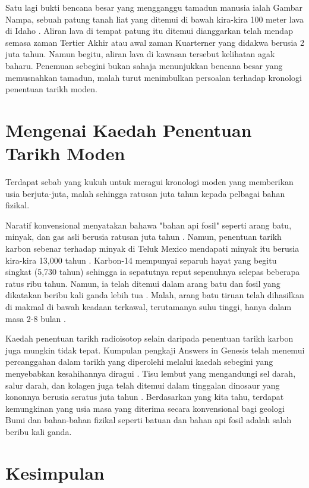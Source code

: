 \documentclass[10pt,twocolumn,letterpaper]{article}
\begin{document}
Satu lagi bukti bencana besar yang mengganggu tamadun manusia ialah Gambar Nampa, sebuah patung tanah liat yang ditemui di bawah kira-kira 100 meter lava di Idaho \cite{102,103}. Aliran lava di tempat patung itu ditemui dianggarkan telah mendap semasa zaman Tertier Akhir atau awal zaman Kuarterner yang didakwa berusia 2 juta tahun. Namun begitu, aliran lava di kawasan tersebut kelihatan agak baharu. Penemuan sebegini bukan sahaja menunjukkan bencana besar yang memusnahkan tamadun, malah turut menimbulkan persoalan terhadap kronologi penentuan tarikh moden.

\section{Mengenai Kaedah Penentuan Tarikh Moden}

Terdapat sebab yang kukuh untuk meragui kronologi moden yang memberikan usia berjuta-juta, malah sehingga ratusan juta tahun kepada pelbagai bahan fizikal.

Naratif konvensional menyatakan bahawa "bahan api fosil" seperti arang batu, minyak, dan gas asli berusia ratusan juta tahun \cite{104}. Namun, penentuan tarikh karbon sebenar terhadap minyak di Teluk Mexico mendapati minyak itu berusia kira-kira 13,000 tahun \cite{105}. Karbon-14 mempunyai separuh hayat yang begitu singkat (5,730 tahun) sehingga ia sepatutnya reput sepenuhnya selepas beberapa ratus ribu tahun. Namun, ia telah ditemui dalam arang batu dan fosil yang dikatakan beribu kali ganda lebih tua \cite{106}. Malah, arang batu tiruan telah dihasilkan di makmal di bawah keadaan terkawal, terutamanya suhu tinggi, hanya dalam masa 2-8 bulan \cite{107}.

Kaedah penentuan tarikh radioisotop selain daripada penentuan tarikh karbon juga mungkin tidak tepat. Kumpulan pengkaji Answers in Genesis telah menemui percanggahan dalam tarikh yang diperolehi melalui kaedah sebegini yang menyebabkan kesahihannya diragui \cite{108}. Tisu lembut yang mengandungi sel darah, salur darah, dan kolagen juga telah ditemui dalam tinggalan dinosaur yang kononnya berusia seratus juta tahun \cite{109,110}. Berdasarkan yang kita tahu, terdapat kemungkinan yang usia masa yang diterima secara konvensional bagi geologi Bumi dan bahan-bahan fizikal seperti batuan dan bahan api fosil adalah salah beribu kali ganda.

\section{Kesimpulan}
\end{document}
